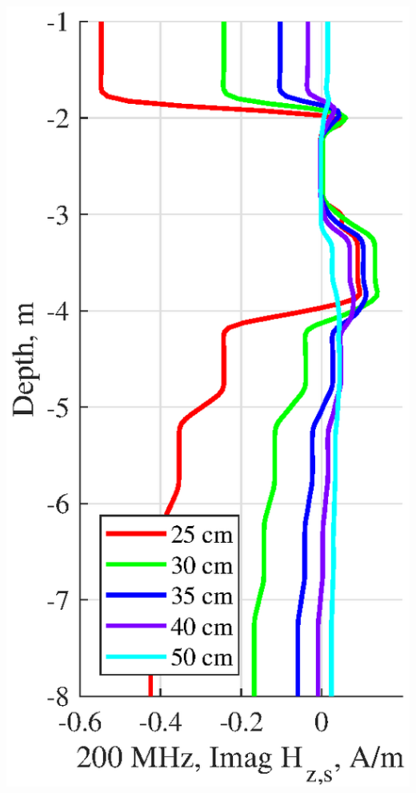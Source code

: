 \documentclass[aspectratio=169]{beamer}
\begin{document}
\begin{frame}
\begin{columns}[c]
\includegraphics[scale=0.44]{cement_solid_logg_Him.eps}

\end{columns}


\end{frame}


\end{document}
